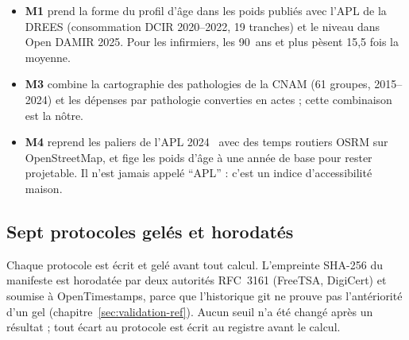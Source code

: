 \begin{itemize}
  \item \textbf{M1} prend la forme du profil d'âge dans les poids publiés avec l'APL de la DREES (consommation DCIR
        2020--2022, 19 tranches) et le niveau dans Open DAMIR 2025. Pour les infirmiers, les 90~ans et plus pèsent
        15,5 fois la moyenne.
  \item \textbf{M3} combine la cartographie des pathologies de la CNAM (61 groupes, 2015--2024) et les dépenses par
        pathologie converties en actes ; cette combinaison est la nôtre.
  \item \textbf{M4} reprend les paliers de l'APL 2024~\citep{vergier2017} avec des temps routiers OSRM sur
        OpenStreetMap, et fige les poids d'âge à une année de base pour rester projetable. Il n'est jamais appelé
        \enquote{APL} : c'est un indice d'accessibilité maison.
\end{itemize}

\subsection{Sept protocoles gelés et horodatés}\label{bes:validation}
Chaque protocole est écrit et gelé avant tout calcul. L'empreinte SHA-256 du manifeste est horodatée par deux
autorités RFC~3161 (FreeTSA, DigiCert) et soumise à OpenTimestamps, parce que l'historique git ne prouve pas
l'antériorité d'un gel (chapitre~\ref{sec:validation-ref}). Aucun seuil n'a été changé après un résultat ; tout écart
au protocole est écrit au registre avant le calcul.


